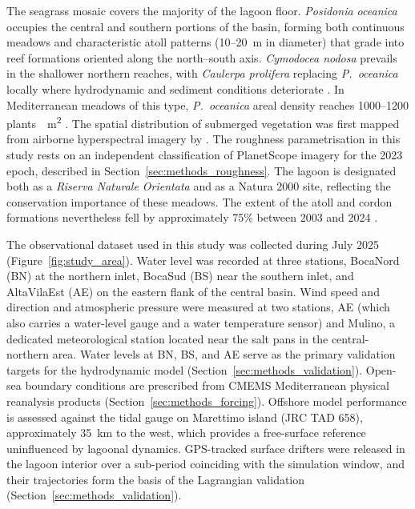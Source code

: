 The seagrass mosaic covers the majority of the lagoon floor.
\emph{Posidonia oceanica} occupies the central and southern portions of the
basin, forming both continuous meadows and characteristic atoll patterns
(10--20~m in diameter) that grade into reef formations oriented along the
north--south axis. \emph{Cymodocea nodosa} prevails in the shallower northern
reaches, with \emph{Caulerpa prolifera} replacing \emph{P.\ oceanica} locally
where hydrodynamic and sediment conditions deteriorate
\citep{LaLoggia2004, CiraoloDeMarchis2009}. In Mediterranean meadows of this
type, \emph{P.\ oceanica} areal density reaches
1000--1200 plants~\si{\per\metre\squared} \citep{Ciraolo2009a}. The spatial
distribution of submerged vegetation was first mapped from airborne
hyperspectral imagery by \citet{CiraoloMaltese2006}. The roughness
parametrisation in this study rests on an independent classification of
PlanetScope imagery for the 2023 epoch, described in
Section~\ref{sec:methods_roughness}. The lagoon is designated both as a
\emph{Riserva Naturale Orientata} and as a Natura 2000 site, reflecting the
conservation importance of these meadows. The extent of the atoll and cordon
formations nevertheless fell by approximately 75\% between 2003 and 2024
\citep{Maltese2025}.

The observational dataset used in this study was collected during July 2025
(Figure~\ref{fig:study_area}). Water level was recorded at three stations,
BocaNord (BN) at the northern inlet, BocaSud (BS) near the southern inlet, and
AltaVilaEst (AE) on the eastern flank of the central basin. Wind speed and
direction and atmospheric pressure were measured at two stations, AE (which
also carries a water-level gauge and a water temperature sensor) and Mulino, a
dedicated meteorological station located near the salt pans in the
central-northern area. Water levels at BN, BS, and AE serve as the primary
validation targets for the hydrodynamic model
(Section~\ref{sec:methods_validation}). Open-sea boundary conditions are
prescribed from CMEMS Mediterranean physical reanalysis products
(Section~\ref{sec:methods_forcing}). Offshore model performance is assessed
against the tidal gauge on Marettimo island (JRC TAD 658), approximately 35~km
to the west, which provides a free-surface reference uninfluenced by lagoonal
dynamics. GPS-tracked surface drifters were released in the lagoon interior
over a sub-period coinciding with the simulation window, and their
trajectories form the basis of the Lagrangian validation
(Section~\ref{sec:methods_validation}).

